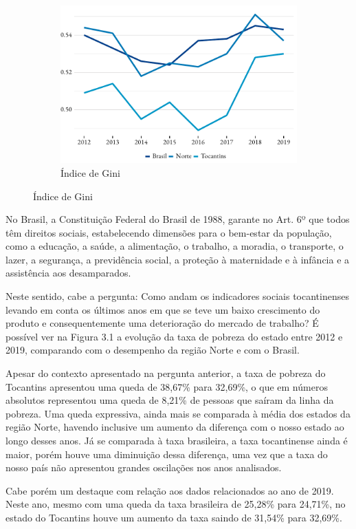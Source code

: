 \begin{figure}[ht]
\begin{subfigure}{\linewidth}
	\end{subfigure}
	\begin{subfigure}{\linewidth}
		\caption{Índice de Gini}
		\includegraphics{fig/gini.pdf}
	\end{subfigure}
\end{figure}
\par No Brasil, a Constituição Federal do Brasil de 1988, garante no Art. 6º que todos têm direitos sociais, estabelecendo dimensões para o bem-estar da população, como a educação, a saúde, a alimentação, o trabalho, a moradia, o transporte, o lazer, a segurança, a previdência social, a proteção à maternidade e à infância e a assistência aos desamparados.
\par Neste sentido, cabe a pergunta: Como andam os indicadores sociais tocantinenses levando em conta os últimos anos em que se teve um baixo crescimento do produto e consequentemente uma deterioração do mercado de trabalho? É possível ver na Figura 3.1 a evolução da taxa de pobreza do estado entre 2012 e 2019, comparando com o desempenho da região Norte e com o Brasil.
\par Apesar do contexto apresentado na pergunta anterior, a taxa de pobreza do Tocantins apresentou uma queda de 38,67\% para 32,69\%, o que em números absolutos representou uma queda de 8,21\% de pessoas que saíram da linha da pobreza. Uma queda expressiva, ainda mais se comparada à média dos estados da região Norte, havendo inclusive um aumento da diferença com o nosso estado ao longo desses anos. Já se comparada à taxa brasileira, a taxa tocantinense ainda é maior, porém houve uma diminuição dessa diferença, uma vez que a taxa do nosso país não apresentou grandes oscilações nos anos analisados.
\par Cabe porém um destaque com relação aos dados relacionados ao ano de 2019. Neste ano, mesmo com uma queda da taxa brasileira de 25,28\% para 24,71\%, no estado do Tocantins houve um aumento da taxa saindo de 31,54\% para 32,69\%.

